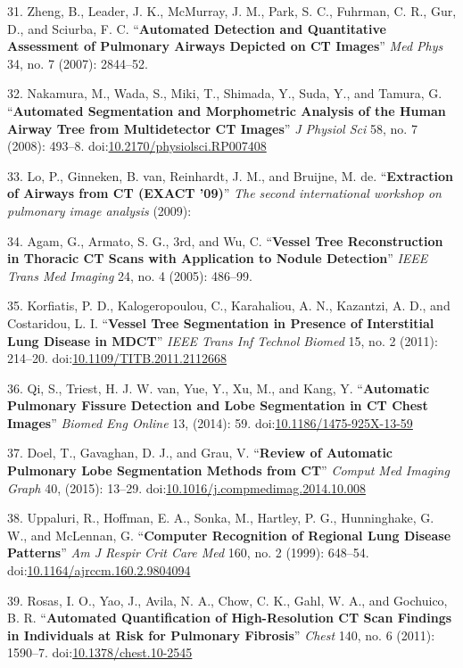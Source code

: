 \documentclass[11pt,]{article}
\begin{document}
31. Zheng, B., Leader, J. K., McMurray, J. M., Park, S. C., Fuhrman, C.
R., Gur, D., and Sciurba, F. C. ``\textbf{Automated Detection and
Quantitative Assessment of Pulmonary Airways Depicted on CT Images}''
\emph{Med Phys} 34, no. 7 (2007): 2844--52.

32. Nakamura, M., Wada, S., Miki, T., Shimada, Y., Suda, Y., and Tamura,
G. ``\textbf{Automated Segmentation and Morphometric Analysis of the
Human Airway Tree from Multidetector CT Images}'' \emph{J Physiol Sci}
58, no. 7 (2008): 493--8.
doi:\href{http://dx.doi.org/10.2170/physiolsci.RP007408}{10.2170/physiolsci.RP007408}

33. Lo, P., Ginneken, B. van, Reinhardt, J. M., and Bruijne, M. de.
``\textbf{Extraction of Airways from CT (EXACT '09)}'' \emph{The second
international workshop on pulmonary image analysis} (2009):

34. Agam, G., Armato, S. G., 3rd, and Wu, C. ``\textbf{Vessel Tree
Reconstruction in Thoracic CT Scans with Application to Nodule
Detection}'' \emph{IEEE Trans Med Imaging} 24, no. 4 (2005): 486--99.

35. Korfiatis, P. D., Kalogeropoulou, C., Karahaliou, A. N., Kazantzi,
A. D., and Costaridou, L. I. ``\textbf{Vessel Tree Segmentation in
Presence of Interstitial Lung Disease in MDCT}'' \emph{IEEE Trans Inf
Technol Biomed} 15, no. 2 (2011): 214--20.
doi:\href{http://dx.doi.org/10.1109/TITB.2011.2112668}{10.1109/TITB.2011.2112668}

36. Qi, S., Triest, H. J. W. van, Yue, Y., Xu, M., and Kang, Y.
``\textbf{Automatic Pulmonary Fissure Detection and Lobe Segmentation in
CT Chest Images}'' \emph{Biomed Eng Online} 13, (2014): 59.
doi:\href{http://dx.doi.org/10.1186/1475-925X-13-59}{10.1186/1475-925X-13-59}

37. Doel, T., Gavaghan, D. J., and Grau, V. ``\textbf{Review of
Automatic Pulmonary Lobe Segmentation Methods from CT}'' \emph{Comput
Med Imaging Graph} 40, (2015): 13--29.
doi:\href{http://dx.doi.org/10.1016/j.compmedimag.2014.10.008}{10.1016/j.compmedimag.2014.10.008}

38. Uppaluri, R., Hoffman, E. A., Sonka, M., Hartley, P. G.,
Hunninghake, G. W., and McLennan, G. ``\textbf{Computer Recognition of
Regional Lung Disease Patterns}'' \emph{Am J Respir Crit Care Med} 160,
no. 2 (1999): 648--54.
doi:\href{http://dx.doi.org/10.1164/ajrccm.160.2.9804094}{10.1164/ajrccm.160.2.9804094}

39. Rosas, I. O., Yao, J., Avila, N. A., Chow, C. K., Gahl, W. A., and
Gochuico, B. R. ``\textbf{Automated Quantification of High-Resolution CT
Scan Findings in Individuals at Risk for Pulmonary Fibrosis}''
\emph{Chest} 140, no. 6 (2011): 1590--7.
doi:\href{http://dx.doi.org/10.1378/chest.10-2545}{10.1378/chest.10-2545}
\end{document}
